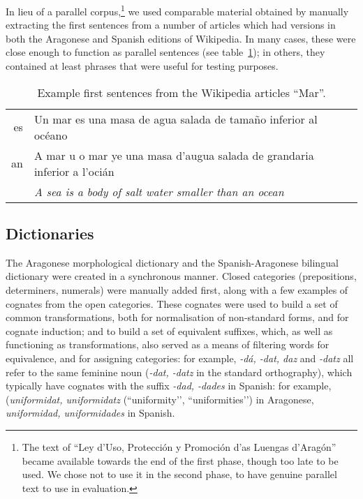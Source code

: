 \documentclass[10pt, a4paper]{article}
\begin{document}
  In lieu of a parallel corpus,\footnote{The text of ``Ley d'Uso, Protección y Promoción d'as Luengas d'Aragón'' became available towards the end of the first phase, though too late to be used. We chose not to use it in the second phase, to have genuine parallel text to use in evaluation.} we used comparable material obtained by manually extracting the first sentences from a number of articles which had versions in both the Aragonese and Spanish editions of Wikipedia. In many cases, these were close enough to function as parallel sentences (see table~\ref{tab:comp}); in others, they contained at least phrases that were useful for testing purposes.








  \begin{table}
  \begin{center}
  \caption{Example first sentences from the Wikipedia articles ``Mar''.\label{tab:comp}}
  \begin{tabular}{r p{5cm}}
     es & Un mar es una masa de agua salada de tamaño inferior al océano \\
     an & A mar u o mar ye una masa d'augua salada de grandaria inferior a l'ocián \\
        & {\em A sea is a body of salt water smaller than an ocean}\\
  \end{tabular}
  \end{center}
  \end{table}
  
  \subsection{Dictionaries}
  
  The Aragonese morphological dictionary and the Spanish-Aragonese bilingual dictionary were created in a synchronous manner. Closed categories (prepositions, determiners, numerals) were manually added first, along with a few examples of cognates from the open categories. These cognates were used to build a set of common transformations, both for normalisation of non-standard forms, and for cognate induction; and to build a set of equivalent suffixes, which, as well as functioning as transformations, also served as a means of filtering words for equivalence, and for assigning categories: for example, {\em -dá,  -dat, daz} and {\em -datz} all refer to the same feminine noun ({\em -dat, -datz} in the standard orthography), which typically have cognates with the suffix {\em -dad, -dades} in Spanish: for example, ({\em uniformidat, uniformidatz} (``uniformity’’, ``uniformities’’) in Aragonese, {\em uniformidad, uniformidades} in Spanish.
\end{document}
